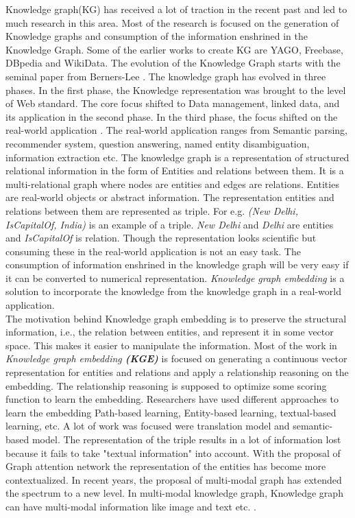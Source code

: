 

Knowledge graph(KG) has received a lot of traction in the recent past and led to much research in this area. Most of the research is focused on the generation of Knowledge graphs and consumption of the information enshrined in the Knowledge Graph. Some of the earlier works to create KG are YAGO, Freebase, DBpedia and WikiData. The evolution of the Knowledge Graph starts with the seminal paper from Berners-Lee . The knowledge graph has evolved in three phases. In the first phase, the Knowledge representation was brought to the level of Web standard. The core focus shifted to Data management, linked data, and its application in the second phase. In the third phase, the focus shifted on the real-world application . The real-world application ranges from Semantic parsing, recommender system, question answering, named entity disambiguation, information extraction  etc. The knowledge graph is a representation of structured relational information in the form of Entities and relations between them. It is a multi-relational graph where nodes are entities and edges are relations. Entities are real-world objects or abstract information. The representation entities and relations between them are represented as triple. For e.g. \textit{(New Delhi, IsCapitalOf, India)} is an example of a triple. \textit{New Delhi} and \textit{Delhi} are entities and \textit{IsCapitalOf} is relation. Though the representation looks scientific but consuming these in the real-world application is not an easy task. The consumption of information enshrined in the knowledge graph will be very easy if it can be converted to numerical representation. \textit{Knowledge graph embedding} is a solution to incorporate the knowledge from the knowledge graph in a real-world application. \\
The motivation behind Knowledge graph embedding  is to preserve the structural information, i.e., the relation between entities, and represent it in some vector space. This makes it easier to manipulate the information. Most of the work in \textit{Knowledge graph embedding \textbf{(KGE)}} is focused on generating a continuous vector representation for entities and relations and apply a relationship reasoning on the embedding. The relationship reasoning is supposed to optimize some scoring function to learn the embedding. Researchers have used different approaches to learn the embedding Path-based learning, Entity-based learning, textual-based learning, etc. A lot of work was focused were translation model  and semantic-based model. The representation of the triple results in a lot of information lost because it fails to take "textual information" into account. With the proposal of Graph attention network  the representation of the entities has become more contextualized. In recent years, the proposal of multi-modal graph has extended the spectrum to a new level. In multi-modal knowledge graph, Knowledge graph can have multi-modal information like image and text etc. . \\
